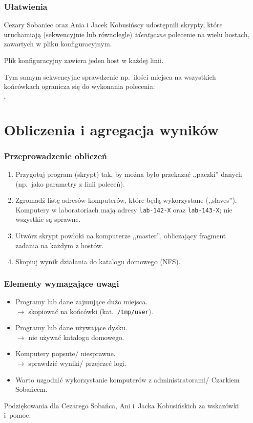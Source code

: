 \documentclass[compress]{beamer}
\newcommand{\terminal}[1]{{\color{blue}{#1}}}
\begin{document}
\begin{frame}
    \frametitle{Ułatwienia}

    Cezary Sobaniec oraz Ania i Jacek Kobusińscy udostępnili skrypty, które uruchamiają 
    (sekwencyjnie lub równolegle) \emph{identyczne} polecenie na wielu hostach, 
    zawartych w pliku konfiguracyjnym. 
    
    \medskip
    Plik konfiguracyjny zawiera jeden host w każdej linii.

    \medskip
    Tym samym sekwencyjne sprawdzenie np.~ilości miejsca na wszystkich końcówkach ogranicza się 
    do wykonania polecenia: \\ \terminal{./rshseq.sh computing.hosts df -h /tmp}.
\end{frame}


\section{Obliczenia i agregacja wyników}

\begin{frame}
    \frametitle{Przeprowadzenie obliczeń}

    \begin{enumerate}
        \item Przygotuj program (skrypt) tak, by można było przekazać ,,paczki'' danych (np.~jako
        parametry z linii poleceń).

        \item Zgromadź listę adresów komputerów, które będą wykorzystane (,,slaves''). Komputery
        w laboratoriach mają adresy \texttt{lab-142-X} oraz \texttt{lab-143-X}; nie wszystkie są sprawne.

        \item Utwórz skrypt powłoki na komputerze ,,master'', obliczający fragment zadania
        na każdym z hostów.

        \item Skopiuj wynik działania do katalogu domowego (NFS).
    \end{enumerate}
\end{frame}

\begin{frame}
    \frametitle{Elementy wymagające uwagi}

    \begin{itemize}
        \item Programy lub dane zajmujące dużo miejsca. \\
            $\to$ skopiować na końcówki (kat.~\texttt{/tmp/user}).
        \item Programy lub dane używające dysku. \\
            $\to$ nie używać katalogu domowego.
        \item Komputery popsute/ niesprawne. \\
            $\to$ sprawdzić wyniki/ przejrzeć logi.
        \item Warto uzgodnić wykorzystanie komputerów z administratorami/
        Czarkiem Sobańcem.
    \end{itemize}
\end{frame}

\begin{frame}[plain]
    Podziękowania dla Cezarego Sobańca, Ani i~Jacka Kobusińskich za wskazówki i~pomoc.
\end{frame}
\end{document}
